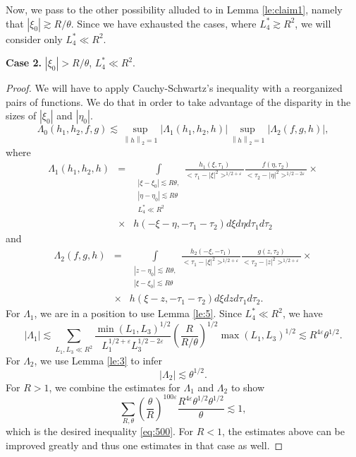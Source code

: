 \documentclass[draft,11pt,leqno]{amsart}
\newcommand{\norm}[2]{{\left\| #1 \right\|}_{#2}}
\newcommand{\ve}{\varepsilon}
\newcommand{\La}{\Lambda}
\newcommand{\intl}{\int\limits}
\newcommand{\suml}{\sum\limits}
\newcommand{\supl}{\sup\limits}
\newcommand{\f}{\displaystyle\frac}
\newcommand{\lfour}{{L_4^{*}}}
\begin{document}
Now, we pass to the other possibility alluded to in Lemma \ref{le:claim1}, 
namely
that $|\xi_0|\gtrsim R/\theta$. Since we have exhausted the cases, where 
$\lfour \gtrsim R^2$, we will consider only $\lfour \ll R^2$.
\vspace{.5cm}
\begin{center}
{\large\bf Case 2.} $|\xi_0|>R/\theta$, $\lfour\ll R^2$.
\end{center}
\vspace{0.5cm}
\begin{proof}
We will have to apply Cauchy-Schwartz's inequality with a reorganized pairs of functions. We do that in order to  take advantage of the 
disparity in the sizes of $|\xi_0|$ and $|\eta_0|$.
$$
\La_0(h_1,h_2,f,g)\lesssim
\supl_{\norm{h}{2}=1}|\La_1(h_1,h_2,h)|\supl_{\norm{h}{2}=1}|\La_2(f,g,h)|,
$$ where 
\begin{eqnarray*}
\La_1(h_1,h_2,h) &=& \intl_{\begin{array}{l}
|\xi-\xi_0|\lesssim  R\theta, \\
|\eta-\eta_0|\lesssim R\theta \\
\lfour\ll R^2
\end{array}}
\f{h_1(\xi,\tau_1)}{<\tau_1-|\xi|^2>^
{1/2+\ve}} \f{f(\eta,\tau_2)}{<\tau_2-|\eta|^2>^{1/2-2\ve}} \times \\
&\times&h(-\xi-\eta,-\tau_1-\tau_2)d\xi  d\eta d\tau_1 d\tau_2
\end{eqnarray*}
and
\begin{eqnarray*}
\La_2(f,g,h) &=& \intl_{\begin{array}{l}
|z-\eta_0|\lesssim  R\theta, \\
|\xi-\xi_0|\lesssim R\theta
\end{array}} \f{h_2(-\xi,-\tau_1)}{<\tau_1-|\xi|^2>^{1/2+\ve}}
\f{g(z,\tau_2)}{<\tau_2-|z|^2>^{1/2+\ve}} \times \\
&\times&h(\xi-z,-\tau_1-\tau_2)
d\xi dz d\tau_1 d\tau_2. 
\end{eqnarray*}
For $\La_1$, we are in a position to use Lemma \ref{le:5}. Since 
$\lfour\ll R^2$, we  have
$$
|\La_1|\lesssim \suml_{L_1,L_3\ll R^2}
\f{\min(L_1,L_3)^{1/2}}{L_1^{1/2+\ve}L_3^{1/2-2\ve}}
\left(\f{R}{R/\theta}\right)^{1/2}
\max(L_1,L_3)^{1/2}\lesssim 
R^{4\ve}\theta^{1/2}.
$$
For $\La_2$, we  use Lemma \ref{le:3} to infer
$$
|\La_2|\lesssim \theta^{1/2}.
$$
For $R>1$, we combine the estimates for 
$\La_1$ and $\La_2$ to show 
$$
\suml_{R,\theta} \left(\f{\theta}{R}\right)^{100\ve} 
\f{R^{4\ve}\theta^{1/2}\theta^{1/2}}{\theta}\lesssim 1,
$$
which is the desired inequality  \eqref{eq:500}. 
For $R<1$, the estimates above can be improved greatly and thus one estimates
in that case as well.
\end{proof}
\end{document}
